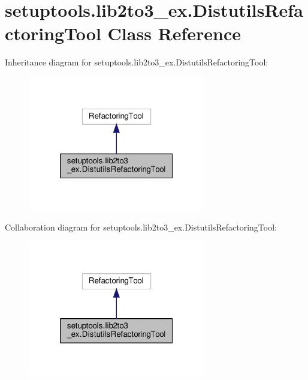 \hypertarget{classsetuptools_1_1lib2to3__ex_1_1DistutilsRefactoringTool}{}\section{setuptools.\+lib2to3\+\_\+ex.\+Distutils\+Refactoring\+Tool Class Reference}
\label{classsetuptools_1_1lib2to3__ex_1_1DistutilsRefactoringTool}


Inheritance diagram for setuptools.\+lib2to3\+\_\+ex.\+Distutils\+Refactoring\+Tool\+:
\nopagebreak
\begin{figure}[H]
\begin{center}
\leavevmode
\includegraphics[width=220pt]{classsetuptools_1_1lib2to3__ex_1_1DistutilsRefactoringTool__inherit__graph}
\end{center}
\end{figure}


Collaboration diagram for setuptools.\+lib2to3\+\_\+ex.\+Distutils\+Refactoring\+Tool\+:
\nopagebreak
\begin{figure}[H]
\begin{center}
\leavevmode
\includegraphics[width=220pt]{classsetuptools_1_1lib2to3__ex_1_1DistutilsRefactoringTool__coll__graph}
\end{center}
\end{figure}
